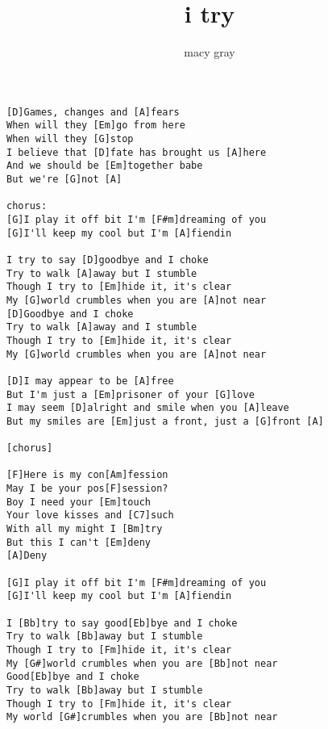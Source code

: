 \author{macy gray}
\title{i try}
\maketitle
\begin{verbatim}   
[D]Games, changes and [A]fears
When will they [Em]go from here
When will they [G]stop
I believe that [D]fate has brought us [A]here
And we should be [Em]together babe
But we're [G]not [A]

chorus:
[G]I play it off bit I'm [F#m]dreaming of you
[G]I'll keep my cool but I'm [A]fiendin

I try to say [D]goodbye and I choke
Try to walk [A]away but I stumble
Though I try to [Em]hide it, it's clear
My [G]world crumbles when you are [A]not near
[D]Goodbye and I choke
Try to walk [A]away and I stumble
Though I try to [Em]hide it, it's clear
My [G]world crumbles when you are [A]not near

[D]I may appear to be [A]free
But I'm just a [Em]prisoner of your [G]love
I may seem [D]alright and smile when you [A]leave
But my smiles are [Em]just a front, just a [G]front [A]

[chorus]

[F]Here is my con[Am]fession
May I be your pos[F]session?
Boy I need your [Em]touch
Your love kisses and [C7]such
With all my might I [Bm]try
But this I can't [Em]deny
[A]Deny

[G]I play it off bit I'm [F#m]dreaming of you
[G]I'll keep my cool but I'm [A]fiendin

I [Bb]try to say good[Eb]bye and I choke
Try to walk [Bb]away but I stumble
Though I try to [Fm]hide it, it's clear
My [G#]world crumbles when you are [Bb]not near
Good[Eb]bye and I choke
Try to walk [Bb]away but I stumble
Though I try to [Fm]hide it, it's clear
My world [G#]crumbles when you are [Bb]not near
\end{verbatim}